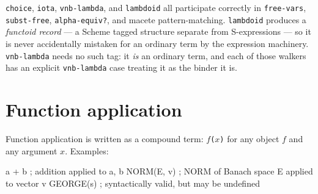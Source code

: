 \begin{remark}
\texttt{choice}, \texttt{iota}, \texttt{vnb-lambda}, and \texttt{lambdoid} all
participate correctly in \texttt{free-vars}, \texttt{subst-free},
\texttt{alpha-equiv?}, and macete pattern-matching.  \texttt{lambdoid} produces
a \emph{functoid record} --- a Scheme tagged structure separate from
S-expressions --- so it is never accidentally mistaken for an ordinary term by
the expression machinery.  \texttt{vnb-lambda} needs no such tag: it \emph{is}
an ordinary term, and each of those walkers has an explicit
\texttt{vnb-lambda} case treating it as the binder it is.
\end{remark}

\section{Function application}
\label{sec:funapp}

Function application is written as a compound term: \texttt{$f$($x$)} for
any object $f$ and any argument $x$.  Examples:
\begin{VNBsnip}
a + b               ; addition applied to a, b
NORM(E, v)          ; NORM of Banach space E applied to vector v
GEORGE(s)           ; syntactically valid, but may be undefined
\end{VNBsnip}

